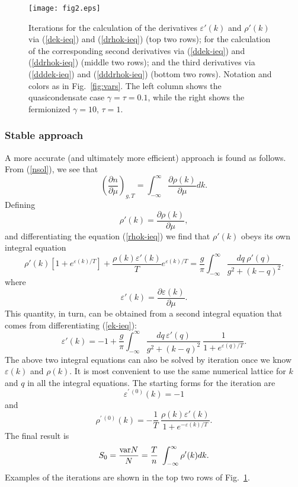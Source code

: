 \documentclass[aps,twocolumn,pra,superscriptaddress,nofootinbib,amsmath,amssymb,floats,floatfix,english]{revtex4-1}
\newcommand{\eqn}[1]{(\ref{#1})}
\renewcommand{\eq}[2]{\begin{equation}\label{#1}#2\end{equation}}
\newcommand{\ve}{\varepsilon}
\begin{document}
\begin{figure}
\begin{center}
\texttt{[image: fig2.eps]}
\end{center}
\caption{
Iterations for the calculation of the derivatives $\ve'(k)$ and $\rho'(k)$ via \eqn{dek-ieq} and \eqn{drhok-ieq} (top two rows);
for the calculation of the corresponding second derivatives via \eqn{ddek-ieq} and \eqn{ddrhok-ieq} (middle two rows);
and the third derivatives via \eqn{dddek-ieq} and \eqn{dddrhok-ieq} (bottom two rows).
Notation and colors as in Fig.~\ref{fig:vars}.
The left column shows the quasicondensate case $\gamma=\tau=0.1$, while the right shows the fermionized $\gamma=10$, $\tau=1$.
}
\label{fig:iters}
\end{figure}


\subsubsection{Stable approach}
A more accurate (and ultimately more efficient) approach is found as follows. 
From \eqn{nsol}, we see that 
\eq{dndu}{
\left(\frac{\partial n}{\partial\mu}\right)_{g,T} = \int_{-\infty}^{\infty} \frac{\partial\rho(k)}{\partial\mu} dk.
}
Defining 
\eq{dpdu}{
\rho'(k) = \frac{\partial\rho(k)}{\partial\mu}, 
}
and differentiating the equation \eqn{rhok-ieq} we find that $\rho'(k)$ obeys its own integral equation
\eq{drhok-ieq}{
\rho'(k)\left[1+e^{\ve(k)/T}\right] + \frac{\rho(k)\ve'(k)}{T} e^{\ve(k)/T}
= \frac{g}{\pi} \int_{-\infty}^{\infty} \frac{dq\ \rho'(q)}{g^2+(k-q)^2}.
}
where
\eq{dedu}{
\ve'(k) = \frac{\partial\ve(k)}{\partial\mu}.
}
This quantity, in turn, can be obtained from a second integral equation that comes from differentiating
\eqn{ek-ieq}: 
\eq{dek-ieq}{
\ve'(k) = -1 +\frac{g}{\pi} \int_{-\infty}^{\infty} \frac{dq\,\ve'(q)}{g^2+(k-q)^2}\ \frac{1}{1+e^{\ve(q)/T}}.
}
The above two integral equations can also be solved by iteration once we know $\ve(k)$ and $\rho(k)$.
It is most convenient to use the same numerical lattice for $k$ and $q$ in all the integral equations.
The starting forms for the iteration are
\eq{diter0}{
\ve^{\prime\,(0)}(k) = -1
}
and
\eq{diter0-rho}{
\rho^{\prime\,(0)}(k) = -\frac{1}{T}\ \frac{\rho(k)\ve'(k)}{1+e^{-\ve(k)/T}}.
}
The final result is
\eq{uGmu}{
S_0 = \frac{{\rm var} N}{N} = \frac{T}{n}\ \int_{-\infty}^{\infty} \rho'(k) dk.
}
Examples of the iterations are shown in the top two rows of Fig.~\ref{fig:iters}. 
\end{document}
